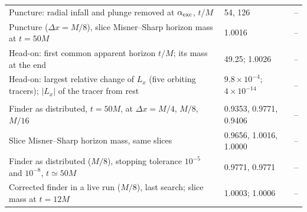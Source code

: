 \begin{table}
\begin{ruledtabular}
\begin{tabular}{p{}p{}p{}}
\raggedright Puncture: radial infall and plunge removed at $\alpha_{\rm exc}$, $t/M$ & \raggedright 54, 126 & \raggedright -- \tabularnewline
\raggedright Puncture ($\Delta x=M/8$), slice Misner--Sharp horizon mass at $t=50M$ & \raggedright 1.0016 & \raggedright -- \tabularnewline
\raggedright Head-on: first common apparent horizon $t/M$; its mass at the end & \raggedright 49.25; 1.0026 & \raggedright -- \tabularnewline
\raggedright Head-on: largest relative change of $L_x$ (five orbiting tracers); $|L_x|$ of the tracer from rest & \raggedright $9.8\times10^{-4}$; $4\times10^{-14}$ & \raggedright -- \tabularnewline
\colrule
\multicolumn{3}{l}{\textit{Apparent-horizon check}} \tabularnewline
\raggedright Finder as distributed, $t=50M$, at $\Delta x=M/4$, $M/8$, $M/16$ & \raggedright 0.9353, 0.9771, 0.9406 & \raggedright -- \tabularnewline
\raggedright Slice Misner--Sharp horizon mass, same slices & \raggedright 0.9656, 1.0016, 1.0000 & \raggedright -- \tabularnewline
\raggedright Finder as distributed ($M/8$), stopping tolerance $10^{-5}$ and $10^{-8}$, $t\simeq50M$ & \raggedright 0.9771, 0.9771 & \raggedright -- \tabularnewline
\raggedright Corrected finder in a live run ($M/8$), last search; slice mass at $t=12M$ & \raggedright 1.0003; 1.0006 & \raggedright -- \tabularnewline
\end{tabular}
\end{ruledtabular}
\end{table}

